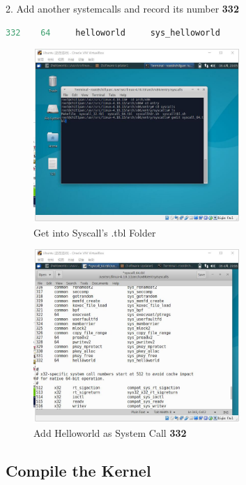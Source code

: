 \documentclass[12pt,a4paper]{article}
\begin{document}
2. Add another systemcalls and record its number \textbf{332}
\begin{lstlisting}[language = C]
  332    64     helloworld     sys_helloworld
\end{lstlisting}

\begin{minipage}{0.5\textwidth}
	\begin{figure}[H]
		\centering
		\includegraphics[width= 0.7\textwidth]{./fig/10_syscall_64_tbl.jpg}
		\caption{Get into Syscall's .tbl Folder}
	\end{figure}
\end{minipage}
\begin{minipage}{0.5\textwidth}
	\begin{figure}[H]
		\centering
		\includegraphics[width= 0.7\textwidth]{./fig/11_syscall_helloworld_entry.jpg}
		\caption{Add Helloworld as System Call \textbf{332}}
	\end{figure}
\end{minipage}

\subsection{Compile the Kernel}
\end{document}
